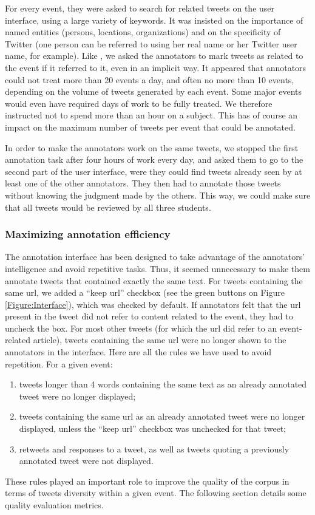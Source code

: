 For every event, they were asked to search for related tweets on the user interface, using a large variety of keywords. It was insisted on the importance of named entities (persons, locations, organizations) and on the specificity of Twitter (one person can be referred to using her real name or her Twitter user name, for example). Like \citet{mcminn_building_2013}, we asked the annotators to mark tweets as related to the event if it referred to it, even in an implicit way. It appeared that annotators could not treat more than 20 events a day, and often no more than 10 events, depending on the volume of tweets generated by each event. Some major events would even have required days of work to be fully treated. We therefore instructed not to spend more than an hour on a subject. This has of course an impact on the maximum number of tweets per event that could be annotated. 


In order to make the annotators work on the same tweets, we stopped the first annotation task after four hours of work every day, and asked them to go to the second part of the user interface, were they could find tweets already seen by at least one of the other annotators. They then had to annotate those tweets without knowing the judgment made by the others. This way, we could make sure that all tweets would be reviewed by all three students.

\subsubsection{Maximizing annotation efficiency}
\label{annotation efficiency}
The annotation interface has been designed to take
advantage of the annotators’ intelligence and avoid
repetitive tasks. Thus, it seemed unnecessary to make
them annotate tweets that contained exactly the same text.
For tweets containing the same url, we added a “keep url”
checkbox (see the green buttons on Figure \ref{Figure:Interface}), which was
checked by default. If annotators felt that the url present in
the tweet did not refer to content related to the event, they
had to uncheck the box. For most other tweets (for which
the url did refer to an event-related article), tweets
containing the same url were no longer shown to the
annotators in the interface.
Here are all the rules we have used to avoid repetition. For
a given event:
\begin{enumerate}
    \item tweets longer than 4 words containing the same text as
an already annotated tweet were no longer displayed;
    \item tweets containing the same url as an already annotated
tweet were no longer displayed, unless the “keep url”
checkbox was unchecked for that tweet;
    \item retweets and responses to a tweet, as well as tweets
quoting a previously annotated tweet were not displayed.
\end{enumerate}
These rules played an important role to improve the
quality of the corpus in terms of tweets diversity within a
given event. The following section details some quality
evaluation metrics.

